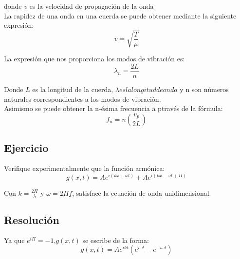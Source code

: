 \documentclass[]{article}
\begin{document}
donde $v$ es la velocidad de propagación de la onda\\

La rapidez de una onda en una cuerda se puede obtener mediante la siguiente expresión:\\

\begin{equation}
v=\sqrt{\frac{T}{\mu}}
\end{equation}

La expresión que nos proporciona los modos de vibración es:\\

\begin{equation}
\lambda_n=\frac{2 L}{n}
\end{equation}

Donde $L$ es la longitud de la cuerda, $\lambda es la longitud de onda$ y n son números naturales correspondientes a los modos de vibración.\\

Asimismo se puede obtener la n-ésima frecuencia a ptravés de la fórmula:\\

\begin{equation}
f_n=n(\frac{v_p}{2L})
\end{equation}

\subsection{Ejercicio}

Verifique experimentalmente que la función armónica:\\

\begin{equation}
g(x,t)=Ae^{i(kx+\omega t)}+Ae^{i(kx-\omega t+\Pi)}
\end{equation}

Con $k=\frac{2 \Pi}{\lambda}$ y $\omega=2 \Pi f$, satisface la ecuación de onda unidimensional.

\subsection{Resolución}

Ya que $e^{i\Pi}=-1$,$g(x,t)$ se escribe de la forma:\\

\begin{equation}
g(x,t)=Ae^{ikt}(e^{i \omega t}-e^{-i \omega t})
\end{equation}
\end{document}
